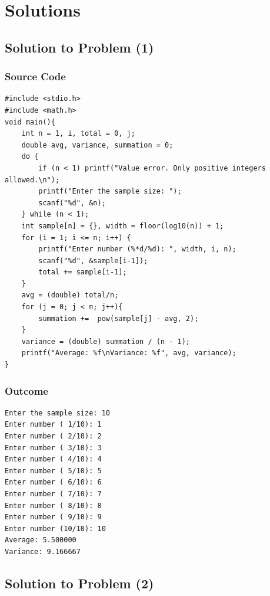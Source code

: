 \documentclass[a4paper,11pt]{article}
\makeatletter
\renewcommand\tableofcontents{%
    \section*{\makebox[\linewidth][c]{\contentsname}%
      \@mkboth{\MakeUppercase\contentsname}{\MakeUppercase\contentsname}}%
    \begin{multicols}{2}%
    \@starttoc{toc}%
    \end{multicols}
    }
\theoremstyle{mytheor}
\theoremstyle{mytheor}
\makeatother
\begin{document}
\tableofcontents
\newpage
\section{Solutions}
\subsection{Solution to Problem (1)}
\subsubsection{Source Code}
\begin{lstlisting}[escapechar=\^,label={list:first},title=Program's \texttt{C} code | Line numbers for readability]
#include <stdio.h>
#include <math.h>
void main(){
    int n = 1, i, total = 0, j;
    double avg, variance, summation = 0;
    do {
        if (n < 1) printf("Value error. Only positive integers allowed.\n");
        printf("Enter the sample size: ");
        scanf("%d", &n);
    } while (n < 1);
    int sample[n] = {}, width = floor(log10(n)) + 1;
    for (i = 1; i <= n; i++) {
        printf("Enter number (%*d/%d): ", width, i, n);
        scanf("%d", &sample[i-1]);
        total += sample[i-1];
    }
    avg = (double) total/n;
    for (j = 0; j < n; j++){
        summation +=  pow(sample[j] - avg, 2);
    }
    variance = (double) summation / (n - 1);
    printf("Average: %f\nVariance: %f", avg, variance);
}
\end{lstlisting}
\subsubsection{Outcome}
\begin{lstlisting}[escapechar=\%,style=output,numbers=none,label={list:second},title=Program's output to console in plaintext -- \texttt{25} as sample size]
Enter the sample size: 10
Enter number ( 1/10): 1
Enter number ( 2/10): 2
Enter number ( 3/10): 3
Enter number ( 4/10): 4
Enter number ( 5/10): 5
Enter number ( 6/10): 6
Enter number ( 7/10): 7
Enter number ( 8/10): 8
Enter number ( 9/10): 9
Enter number (10/10): 10
Average: 5.500000
Variance: 9.166667
\end{lstlisting}
\subsection{Solution to Problem (2)}
\end{document}
